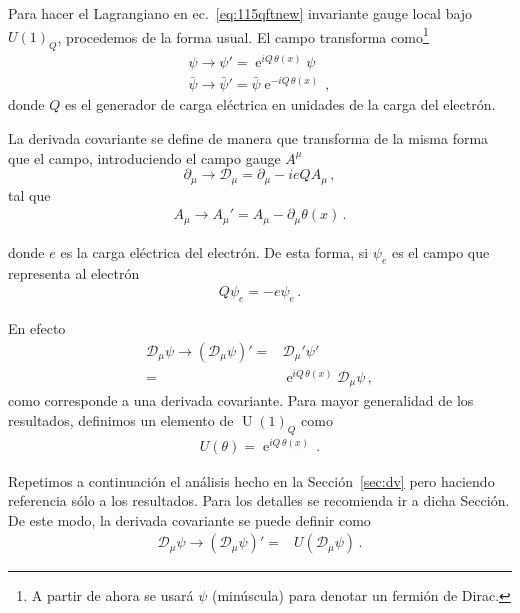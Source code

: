 \begin{frame}
Para hacer el Lagrangiano en ec.~\eqref{eq:115qftnew} invariante gauge local bajo $U(1)_Q$, procedemos de la forma usual. El campo transforma como\footnote{A partir de ahora se usará $\psi$ (minúscula) para denotar un fermión de Dirac.}
\begin{align}
  \psi\to\psi'=\operatorname{e}^{iQ\, \theta(x)}\psi\nonumber\\
  \bar{\psi}\to\bar{\psi}'=\bar{\psi}\operatorname{e}^{-iQ\,\theta(x)}\,,
\end{align}
donde $Q$ es el generador de carga eléctrica en unidades de la carga del electrón.

La derivada covariante se define de manera que transforma de la misma forma que el campo, introduciendo el campo gauge $A^\mu$
\begin{equation}
  \label{eq:202qft}
  \partial_\mu\to\mathcal{D}_\mu=\partial_\mu-ieQA_\mu\,,
\end{equation}
tal que
\begin{align}
  A_{\mu}\to A_{\mu}'=A_{\mu}-\partial_{\mu}\theta(x)\,.
\end{align}

donde $e$ es la carga eléctrica del electrón. De esta forma, si $\psi_e$ es el campo que representa al electrón
\begin{align}
  Q \psi_e=-e \psi_e\,.
\end{align}

En efecto
\begin{align}
  \mathcal{D}_{\mu}\psi\to \left( \mathcal{D}_{\mu}\psi \right)'=&\mathcal{D}_{\mu}'\psi' \nonumber\\
=&\operatorname{e}^{iQ\, \theta(x)}\mathcal{D}_{\mu}\psi\,,
\end{align}
como corresponde a una derivada covariante. Para mayor generalidad de los resultados, definimos un elemento de $\operatorname{U}(1)_Q$ como
\begin{align}
  U(\theta)=\operatorname{e}^{iQ\, \theta(x)}\,.
\end{align}

Repetimos a continuación el análisis hecho en la Sección~\ref{sec:dv} pero haciendo referencia sólo a los resultados. Para los detalles se recomienda ir a dicha Sección. De este modo, la derivada covariante se puede definir como
\begin{align}
     \mathcal{D}_\mu \psi\to\left(\mathcal{D}_\mu \psi\right)'=&U\left(\mathcal{D}_\mu \psi\right)\,.
\end{align}


\end{frame}
